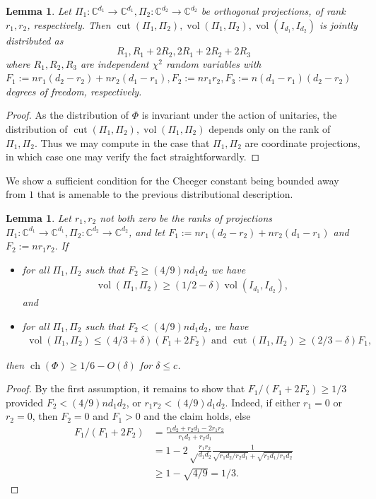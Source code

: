 \documentclass[aos]{imsart}
\newtheorem{lemma}[theorem]{Lemma}
\theoremstyle{definition}
\numberwithin{equation}{section}
\DeclareMathOperator{\vol}{vol}
\DeclareMathOperator{\cut}{cut}
\DeclareMathOperator{\ch}{ch}
\newcommand{\C}{{\mathbb{C}}}
\begin{document}
\begin{appendix}
\begin{lemma}\label{fact:chi} Let $\Pi_1:\C^{d_1} \to \C^{d_1}, \Pi_2: \C^{d_2} \to \C^{d_2}$ be orthogonal projections, of rank $r_1, r_2$, respectively. Then $\cut(\Pi_1, \Pi_2), \vol(\Pi_1, \Pi_2), \vol(I_{d_1}, I_{d_2})$ is jointly distributed as
$$ R_1, R_1 + 2R_2, 2R_1 + 2 R_2 + 2R_3$$ where
$R_1, R_2, R_3$ are independent $\chi^2$ random variables with $F_1:=n r_1(d_2 - r_2) + n r_2(d_1-r_1), F_2:= n r_1r_2, F_3:= n(d_1 - r_1)(d_2 - r_2)$ degrees of freedom, respectively.
\end{lemma}
\begin{proof} As the distribution of $\Phi$ is invariant under the action of unitaries, the distribution of $\cut(\Pi_1, \Pi_2), \vol(\Pi_1, \Pi_2)$ depends only on the rank of $\Pi_1, \Pi_2$. Thus we may compute in the case that $\Pi_1, \Pi_2$ are coordinate projections, in which case one may verify the fact straightforwardly.
\end{proof}


 We show a sufficient condition for the Cheeger constant being bounded away from $1$ that is amenable to the previous distributional description.
\begin{lemma}\label{lem:suff}
Let $r_1, r_2$ not both zero be the ranks of projections $\Pi_1: \C^{d_1} \to \C^{d_1}, \Pi_2: \C^{d_2} \to \C^{d_2}$, and let $F_1:= n r_1(d_2 - r_2) + n r_2(d_1-r_1)$ and $F_2:=n r_1r_2.$ If
\begin{itemize}
\item for all $\Pi_1, \Pi_2$ such that $F_2 \geq (4/9) n d_1 d_2$ we have
\begin{gather}\vol(\Pi_1, \Pi_2) \geq (1/2 - \delta) \vol(I_{d_1}, I_{d_2}),\label{eq:vol}\end{gather} and
\item for all $\Pi_1, \Pi_2$ such that $F_2 < (4/9) n d_1 d_2$, we have
\begin{gather} \vol(\Pi_1, \Pi_2) \leq (4/3 + \delta)(F_1 + 2 F_2) \textrm{ and } \cut(\Pi_1, \Pi_2) \geq (2/3 - \delta) F_1,\label{eq:cut} \end{gather}
\end{itemize}
then $\ch(\Phi) \geq 1/6 - O(\delta)$ for $\delta \leq c$.
\end{lemma}
\begin{proof} By the first assumption, it remains to show that $F_1/(F_1 + 2 F_2) \geq 1/3$ provided $F_2 < (4/9) n d_1 d_2$, or $r_1 r_2 < (4/9) d_1 d_2$. Indeed, if either $r_1 = 0$ or $r_2 = 0$, then $F_2 = 0$ and $F_1>0$ and the claim holds, else
\begin{align*}F_1/(F_1 + 2 F_2) &= \frac{r_1 d_2 + r_2 d_1 - 2 r_1 r_2}{r_1 d_2 + r_2 d_1}\\
 &= 1 -2 \sqrt\frac{ r_1 r_2}{d_1 d_2} \frac{1}{ \sqrt{ r_1 d_2/r_2 d_1} + \sqrt{r_2 d_1/ r_1 d_2}} \\
 &\geq 1 - \sqrt{4/9} = 1/3.
\end{align*}


\end{proof}
\end{appendix}
\end{document}
